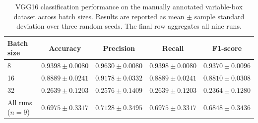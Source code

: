 \begin{table}[htbp]
    \centering
    \caption{VGG16 classification performance on the manually annotated variable-box dataset across batch sizes. Results are reported as mean $\pm$ sample standard deviation over three random seeds. The final row aggregates all nine runs.}
    \label{tab:vgg16_variable_boxes_batch_size}
    \begin{tabular}{lcccc}
        \toprule
        Batch size & Accuracy & Precision & Recall & F1-score \\
        \midrule
        8  & $\mathbf{0.9398 \pm 0.0080}$ & $\mathbf{0.9630 \pm 0.0080}$ & $\mathbf{0.9398 \pm 0.0080}$ & $\mathbf{0.9370 \pm 0.0096}$ \\
        16 & $0.8889 \pm 0.0241$ & $0.9178 \pm 0.0332$ & $0.8889 \pm 0.0241$ & $0.8810 \pm 0.0308$ \\
        32 & $0.2639 \pm 0.1203$ & $0.2576 \pm 0.1409$ & $0.2639 \pm 0.1203$ & $0.2364 \pm 0.1280$ \\
        \midrule
        All runs ($n=9$) & $0.6975 \pm 0.3317$ & $0.7128 \pm 0.3495$ & $0.6975 \pm 0.3317$ & $0.6848 \pm 0.3436$ \\
        \bottomrule
    \end{tabular}
\end{table}

